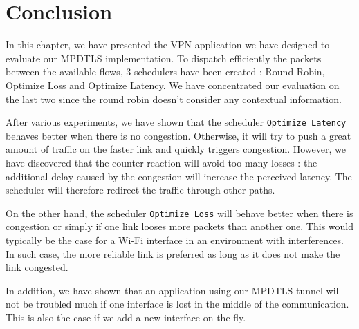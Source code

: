 \section{Conclusion}

In this chapter, we have presented the VPN application we have designed to evaluate our MPDTLS implementation. To dispatch efficiently the packets between the available flows, 3 schedulers have been created : Round Robin, Optimize Loss and Optimize Latency. We have concentrated our evaluation on the last two since the round robin doesn't consider any contextual information. 

After various experiments, we have shown that the scheduler \texttt{Optimize Latency} behaves better when there is no congestion. Otherwise, it will try to push a great amount of traffic on the faster link and quickly triggers congestion. However, we have discovered that the counter-reaction will avoid too many losses : the additional delay caused by the congestion will increase the perceived latency. The scheduler will therefore redirect the traffic through other paths.

On the other hand, the scheduler \texttt{Optimize Loss} will behave better when there is congestion or simply if one link looses more packets than another one. This would typically be the case for a Wi-Fi interface in an environment with interferences. In such case, the more reliable link is preferred as long as it does not make the link congested.

In addition, we have shown that an application using our MPDTLS tunnel will not be troubled much if one interface is lost in the middle of the communication. This is also the case if we add a new interface on the fly.






 